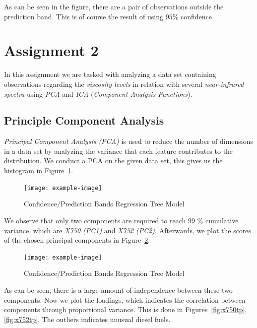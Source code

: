 \documentclass[a4paper, twocolumn]{article}
\begin{document}
        As can be seen in the figure, there are a pair of observations outside the prediction band. This is of course the result of using $95\%$ confidence.

    \section*{Assignment 2}

        In this assignment we are tasked with analyzing a data set containing observations regarding the \emph{viscosity levels} in relation with several \emph{near-infrared spectra} using \emph{PCA} and \emph{ICA} (\emph{Component Analysis Functions}).

    \subsection*{Principle Component Analysis}

        \emph{Principal Component Analysis (PCA)} is used to reduce the number of dimensions in a data set by analyzing the variance that each feature contributes to the distribution. We conduct a PCA on the given data set, this gives us the histogram in Figure~\ref{fig:pcahist}.

        \begin{figure}[h!]
            \centering
            \caption{Confidence/Prediction Bands Regression Tree Model}
            \label{fig:pcahist}
            \texttt{[image: example-image]}
        \end{figure}

        We observe that only two components are required to reach 99 \% cumulative variance, which are \emph{X750 (PC1)} and \emph{X752 (PC2)}. Afterwards, we plot the scores of the chosen principal components in Figure~\ref{fig:pcascore.eps}.

        \begin{figure}[h!]
            \centering
            \caption{Confidence/Prediction Bands Regression Tree Model}
            \label{fig:pcascore.eps}
            \texttt{[image: example-image]}
        \end{figure}

        As can be seen, there is a large amount of independence between these two components. Now we plot the loadings, which indicates the correlation between components through proportional variance. This is done in Figures~\ref{fig:x750tp}, \ref{fig:x752tp}. The outliers indicates unusual diesel fuels.
\end{document}
